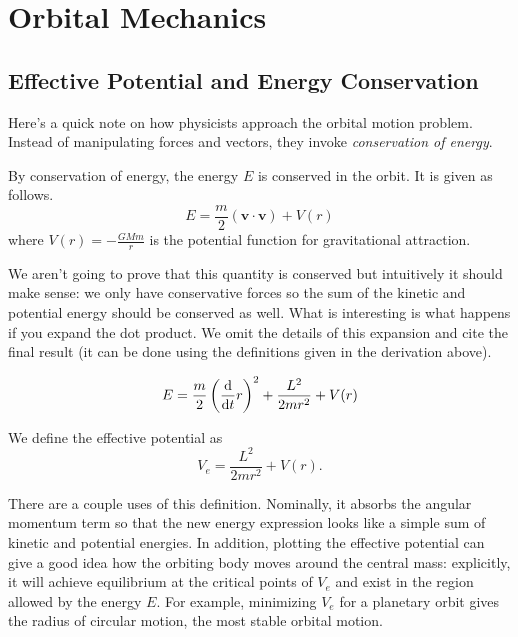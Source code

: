\section{Orbital Mechanics}\label{section-orbmech}
\subsection{Effective Potential and Energy Conservation}
Here's a quick note on how physicists approach the orbital motion problem. Instead of manipulating forces and vectors, they invoke \textit{conservation of energy}. 
\begin{theorem}
By conservation of energy, the energy $E$ is conserved in the orbit. It is given as follows. 
\begin{equation}
    E = \frac{m}{2}\left(\bm v \cdot \bm v\right) + V(r)
\end{equation}
where $V(r) = -\frac{GMm}{r}$ is the potential function for gravitational attraction.
\end{theorem}
We aren't going to prove that this quantity is conserved but intuitively it should make sense: we only have conservative forces so the sum of the kinetic and potential energy should be conserved as well. What is interesting is what happens if you expand the dot product. We omit the details of this expansion and cite the final result (it can be done using the definitions given in the derivation above). 
\begin{corollary}\label{conservationofenergy}
\begin{equation}
    E = \frac{m}{2}\left(\frac{\mathrm{d}}{\mathrm{d}t}{r}\right)^2 + \frac{L^2}{2m r^2} + V(r)
\end{equation}
\end{corollary}
\begin{defn}
We define the effective potential as \begin{equation}
    V_e = \frac{L^2}{2m r^2} + V(r).
\end{equation}
\end{defn}
There are a couple uses of this definition. Nominally, it absorbs the angular momentum term so that the new energy expression looks like a simple sum of kinetic and potential energies. In addition, plotting the effective potential can give a good idea how the orbiting body moves around the central mass: explicitly, it will achieve equilibrium at the critical points of $V_e$ and exist in the region allowed by the energy $E$. For example, minimizing $V_e$ for a planetary orbit gives the radius of circular motion, the most stable orbital motion. 

